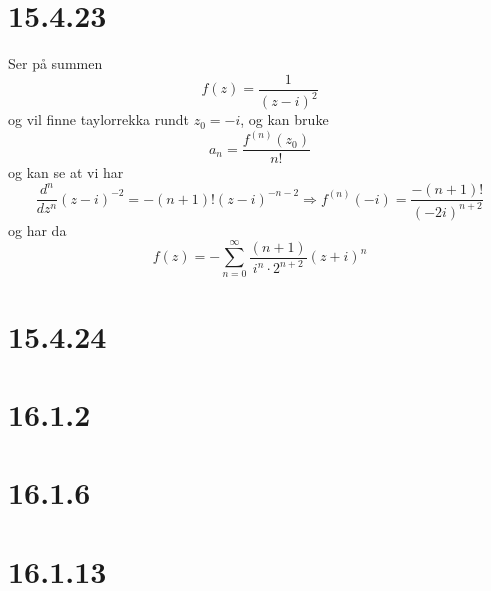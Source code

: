 \documentclass{report}
\begin{document}
\section*{15.4.23}
Ser på summen
\begin{equation}
  \label{eq:15}
  f(z) = \frac{1}{(z-i)^{2}}
\end{equation}
og vil finne taylorrekka rundt $z_{0} = -i$, og kan bruke
\begin{equation}
  \label{eq:19}
  a_{n} = \frac{f^{(n)}(z_{0})}{n!}
\end{equation}
og kan se at vi har
\begin{equation}
  \label{eq:20}
  \frac{d^{n}}{dz^{n}} (z-i)^{-2} = -(n+1)! (z-i)^{-n-2} \Rightarrow f^{(n)}(-i) = \frac{-(n+1)!}{(-2i)^{n+2}}
\end{equation}
og har da
\begin{equation}
  \label{eq:21}
  f(z) = -\sum_{n=0}^{\infty} \frac{ (n+1) }{i^{n} \cdot 2^{n+2}} (z + i)^{n}
\end{equation}


\section*{15.4.24}
\section*{16.1.2}
\section*{16.1.6}
\section*{16.1.13}
\end{document}
